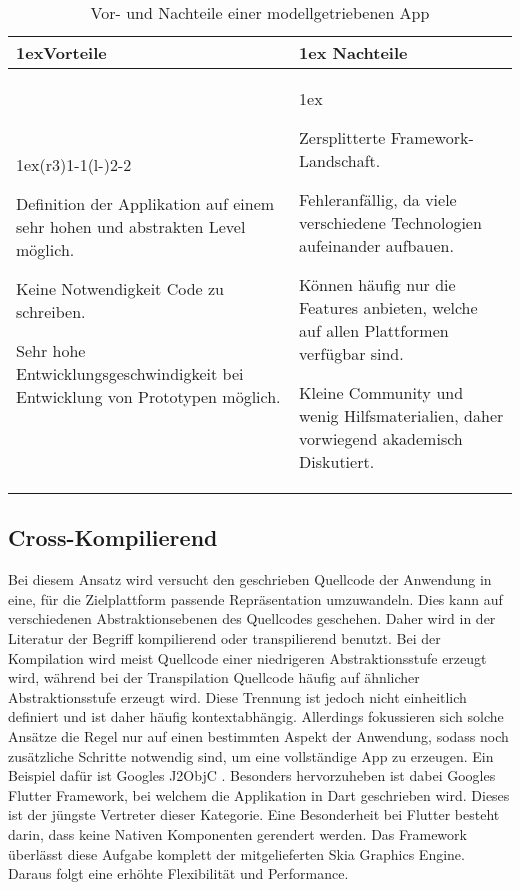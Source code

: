 \begin{table}[h]
	\begin{tabularx}{\linewidth}{>{\parskip1ex}X@{\kern4\tabcolsep}>{\parskip1ex}X}
		\toprule
		\hfil\bfseries Vorteile
		&
		\hfil\bfseries Nachteile
		\\\cmidrule(r{3\tabcolsep}){1-1}\cmidrule(l{-\tabcolsep}){2-2}
		
		Definition der Applikation auf einem sehr hohen und abstrakten Level möglich.\par
		Keine Notwendigkeit Code zu schreiben.\par
		Sehr hohe Entwicklungsgeschwindigkeit bei Entwicklung von Prototypen möglich.\par

		&
		
		Zersplitterte Framework-Landschaft.\par
		Fehleranfällig, da viele verschiedene Technologien aufeinander aufbauen.\par
		Können häufig nur die Features anbieten, welche auf allen Plattformen verfügbar sind.\par
		Kleine Community und wenig Hilfsmaterialien, daher vorwiegend akademisch Diskutiert.\par
		
		\\\bottomrule
	\end{tabularx}
	\caption{Vor- und Nachteile einer modellgetriebenen App}
\end{table}


\newpage
\subsection{Cross-Kompilierend}

Bei diesem Ansatz wird versucht den geschrieben Quellcode der Anwendung in eine, für die Zielplattform passende Repräsentation umzuwandeln. Dies kann auf verschiedenen Abstraktionsebenen des Quellcodes geschehen. Daher wird in der Literatur der Begriff kompilierend oder transpilierend benutzt. Bei der Kompilation wird meist Quellcode einer niedrigeren Abstraktionsstufe erzeugt wird, während bei der Transpilation Quellcode häufig auf ähnlicher Abstraktionsstufe erzeugt wird. Diese Trennung ist jedoch nicht einheitlich definiert und ist daher häufig kontextabhängig. Allerdings fokussieren sich solche Ansätze die Regel nur auf einen bestimmten Aspekt der Anwendung, sodass noch zusätzliche Schritte notwendig sind, um eine vollständige App zu erzeugen. Ein Beispiel dafür ist Googles J2ObjC \cite{hansen_performance_overhead_cross_platform}.
Besonders hervorzuheben ist dabei Googles Flutter Framework, bei welchem die Applikation in Dart geschrieben wird. Dieses ist der jüngste Vertreter dieser Kategorie. Eine Besonderheit bei Flutter besteht darin, dass keine Nativen Komponenten gerendert werden. Das Framework überlässt diese Aufgabe komplett der mitgelieferten Skia Graphics Engine. Daraus folgt eine erhöhte Flexibilität und Performance\cite{medium_rendering_flutter}. \\

